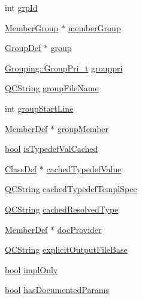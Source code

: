 \begin{DoxyCompactItemize}
\item 
int \hyperlink{class_member_def_impl_a784d7ffa09c8f22d758a47ea730d4d9b}{grp\+Id}
\item 
\hyperlink{class_member_group}{Member\+Group} $\ast$ \hyperlink{class_member_def_impl_a089e0d4f9153d6cd4afe947384961ad2}{member\+Group}
\item 
\hyperlink{class_group_def}{Group\+Def} $\ast$ \hyperlink{class_member_def_impl_ab2f2ad83fac6686d918ebc1607eb0564}{group}
\item 
\hyperlink{struct_grouping_a9f0ec5ab376b083ebe3274ea79fd2d70}{Grouping\+::\+Group\+Pri\+\_\+t} \hyperlink{class_member_def_impl_a422172e0211764448dde35c75f8bee06}{grouppri}
\item 
\hyperlink{class_q_c_string}{Q\+C\+String} \hyperlink{class_member_def_impl_a8b00b9dc57b5ed24c9613db054072ff8}{group\+File\+Name}
\item 
int \hyperlink{class_member_def_impl_a0b97d25d4a0c3641b50ea4fb2d502318}{group\+Start\+Line}
\item 
\hyperlink{class_member_def}{Member\+Def} $\ast$ \hyperlink{class_member_def_impl_ae54e843342df076cfa9375143ed280f6}{group\+Member}
\item 
\hyperlink{qglobal_8h_a1062901a7428fdd9c7f180f5e01ea056}{bool} \hyperlink{class_member_def_impl_a3772e104df284f1e9c6c353f95d63888}{is\+Typedef\+Val\+Cached}
\item 
\hyperlink{class_class_def}{Class\+Def} $\ast$ \hyperlink{class_member_def_impl_a70e8f392743fbaebe8a48ffcfdbf742e}{cached\+Typedef\+Value}
\item 
\hyperlink{class_q_c_string}{Q\+C\+String} \hyperlink{class_member_def_impl_af5d741d67f41577033a31c0dc37e516b}{cached\+Typedef\+Templ\+Spec}
\item 
\hyperlink{class_q_c_string}{Q\+C\+String} \hyperlink{class_member_def_impl_a3b1306e163319f6f73e0cef2db0346cb}{cached\+Resolved\+Type}
\item 
\hyperlink{class_member_def}{Member\+Def} $\ast$ \hyperlink{class_member_def_impl_a1ab1d06a72e4d41c162104049033abcf}{doc\+Provider}
\item 
\hyperlink{class_q_c_string}{Q\+C\+String} \hyperlink{class_member_def_impl_ac40cfb6a22044120f61004b422c006f8}{explicit\+Output\+File\+Base}
\item 
\hyperlink{qglobal_8h_a1062901a7428fdd9c7f180f5e01ea056}{bool} \hyperlink{class_member_def_impl_aaaad556406a4a8fe999aec2e27f2f50e}{impl\+Only}
\item 
\hyperlink{qglobal_8h_a1062901a7428fdd9c7f180f5e01ea056}{bool} \hyperlink{class_member_def_impl_a6460e6978ab13753c7f2c4ddc58fb90b}{has\+Documented\+Params}

\end{DoxyCompactItemize}
